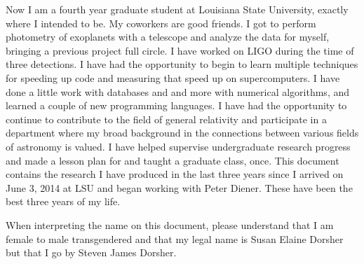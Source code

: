 \documentclass[12pt,letterpaper]{lsuetd}
\begin{document}
Now I am a fourth year graduate student at Louisiana State University, exactly where I intended to be. My coworkers are good friends. I got to perform photometry of exoplanets with a telescope and analyze the data for myself, bringing a previous project full circle. I have worked on LIGO during the time of three detections. I have had the opportunity to begin to learn multiple techniques for speeding up code and measuring that speed up on supercomputers. I have done a little work with databases and and more with numerical algorithms, and learned a couple of new programming languages. I have had the opportunity to continue to contribute to the field of general relativity and participate in a department where my broad background in the connections between various fields of astronomy is valued. I have helped supervise undergraduate research progress and made a lesson plan for and taught a graduate class, once. This document contains the research I have produced in the last three years since I arrived on June 3, 2014 at LSU and began working with Peter Diener. These have been the best three years of my life.

When interpreting the name on this document, please understand that I am female to male transgendered and that my legal name is Susan Elaine Dorsher but that I go by Steven James Dorsher.
\end{document}
